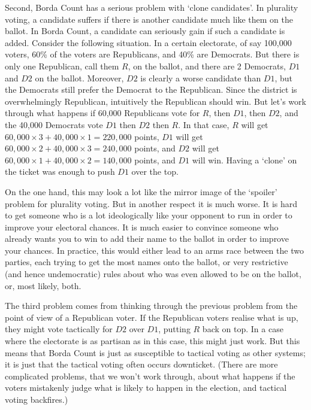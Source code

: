 \documentclass[11pt,]{article}
\begin{document}
Second, Borda Count has a serious problem with `clone candidates'. In
plurality voting, a candidate suffers if there is another candidate much
like them on the ballot. In Borda Count, a candidate can seriously gain
if such a candidate is added. Consider the following situation. In a
certain electorate, of say 100,000 voters, 60\% of the voters are
Republicans, and 40\% are Democrats. But there is only one Republican,
call them \(R\), on the ballot, and there are 2 Democrats, \(D1\) and
\(D2\) on the ballot. Moreover, \(D2\) is clearly a worse candidate than
\(D1\), but the Democrats still prefer the Democrat to the Republican.
Since the district is overwhelmingly Republican, intuitively the
Republican should win. But let's work through what happens if 60,000
Republicans vote for \(R\), then \(D1\), then \(D2\), and the 40,000
Democrats vote \(D1\) then \(D2\) then \(R\). In that case, \(R\) will
get \(60,000 \times 3 + 40,000 \times 1 = 220,000\) points, \(D1\) will
get \(60,000 \times 2 + 40,000 \times 3 = 240,000\) points, and \(D2\)
will get \(60,000 \times 1 + 40,000 \times 2 = 140,000\) points, and
\(D1\) will win. Having a `clone' on the ticket was enough to push
\(D1\) over the top.

On the one hand, this may look a lot like the mirror image of the
`spoiler' problem for plurality voting. But in another respect it is
much worse. It is hard to get someone who is a lot ideologically like
your opponent to run in order to improve your electoral chances. It is
much easier to convince someone who already wants you to win to add
their name to the ballot in order to improve your chances. In practice,
this would either lead to an arms race between the two parties, each
trying to get the most names onto the ballot, or very restrictive (and
hence undemocratic) rules about who was even allowed to be on the
ballot, or, most likely, both.

The third problem comes from thinking through the previous problem from
the point of view of a Republican voter. If the Republican voters
realise what is up, they might vote tactically for \(D2\) over \(D1\),
putting \(R\) back on top. In a case where the electorate is as partisan
as in this case, this might just work. But this means that Borda Count
is just as susceptible to tactical voting as other systems; it is just
that the tactical voting often occurs downticket. (There are more
complicated problems, that we won't work through, about what happens if
the voters mistakenly judge what is likely to happen in the election,
and tactical voting backfires.)
\end{document}
